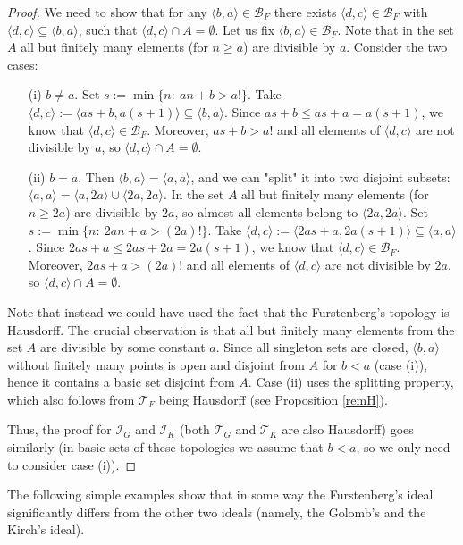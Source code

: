 \documentclass{amsart}
\theoremstyle{definition}
\newcommand{\I}{\mathcal I}
\newcommand{\T}{\mathcal{T}}
\newcommand{\B}{\mathcal{B}}
\newcommand{\arithseq}[2]{\langle#2, #1\rangle}
\begin{document}
\begin{proof}
We need to show that for any $\arithseq{a}{b} \in \B_F$ there exists $\arithseq{c}{d} \in \B_F$ with $\arithseq{c}{d} \subseteq \arithseq{a}{b}$, such that $\arithseq{c}{d}\cap A = \emptyset$. Let us fix $\arithseq{a}{b} \in \B_F$. Note that in the set $A$ all but finitely many elements (for $n\geq a$) are divisible by $a$. Consider the two cases:
\begin{itemize}
 \item[(i)] $b\neq a$. Set $s:= \min \{n :\ an+b>a!\}$. Take $\arithseq{c}{d} := \arithseq{a(s+1)}{as+b}\subseteq \arithseq{a}{b}$. Since $as+b\leq as+a = a(s+1)$, we know that $\arithseq{c}{d}\in \B_F$. Moreover, $as+b>a!$ and all elements of $\arithseq{c}{d}$ are not divisible by $a$, so $\arithseq{c}{d}\cap A = \emptyset$.
 \item[(ii)] $b=a$. Then $\arithseq{a}{b} = \arithseq{a}{a}$, and we can "split" it into two disjoint subsets: $\arithseq{a}{a} = \arithseq{2a}{a}\cup \arithseq{2a}{2a}$. In the set $A$ all but finitely many elements (for $n\geq 2a$) are divisible by $2a$, so almost all elements belong to $\arithseq{2a}{2a}$. Set $s:= \min \{n :\ 2an+a>(2a)!\}$. Take $\arithseq{c}{d} := \arithseq{2a(s+1)}{2as+a}\subseteq \arithseq{a}{a}$. Since $2as+a\leq 2as+2a = 2a(s+1)$, we know that $\arithseq{c}{d}\in \B_F$. Moreover, $2as+a>(2a)!$ and all elements of $\arithseq{c}{d}$ are not divisible by $2a$, so $\arithseq{c}{d}\cap A = \emptyset$.
\end{itemize}

Note that instead we could have used the fact that the Furstenberg's topology is Hausdorff. The crucial observation is that all but finitely many elements from the set $A$ are divisible by some constant $a$. Since all singleton sets are closed, $\arithseq{a}{b}$ without finitely many points is open and disjoint from $A$ for $b<a$ (case (i)), hence it contains a basic set disjoint from $A$. Case (ii) uses the splitting property, which also follows from $\T_F$ being Hausdorff (see Proposition \ref{remH}).

Thus, the proof for $\I_G$ and $\I_K$ (both $\T_G$ and $\T_K$ are also Hausdorff) goes similarly (in basic sets of these topologies we assume that $b<a$, so we only need to consider case (i)).
\end{proof}

The following simple examples show that in some way the Furstenberg's ideal significantly differs from the other two ideals (namely, the Golomb's and the Kirch's ideal).
\end{document}
